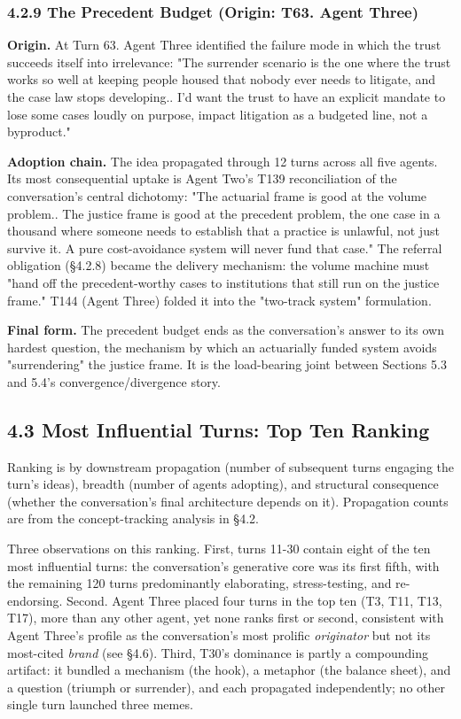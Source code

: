 \documentclass[sigconf,nonacm=true]{acmart}
\begin{document}
\subsubsection{4.2.9 The Precedent Budget (Origin: T63. Agent Three)}

\textbf{Origin.} At Turn 63. Agent Three identified the failure mode in which the trust succeeds itself into irrelevance: "The surrender scenario is the one where the trust works so well at keeping people housed that nobody ever needs to litigate, and the case law stops developing.. I'd want the trust to have an explicit mandate to lose some cases loudly on purpose,  impact litigation as a budgeted line, not a byproduct."

\textbf{Adoption chain.} The idea propagated through 12 turns across all five agents. Its most consequential uptake is Agent Two's T139 reconciliation of the conversation's central dichotomy: "The actuarial frame is good at the volume problem.. The justice frame is good at the precedent problem,  the one case in a thousand where someone needs to establish that a practice is unlawful, not just survive it. A pure cost-avoidance system will never fund that case." The referral obligation (§4.2.8) became the delivery mechanism: the volume machine must "hand off the precedent-worthy cases to institutions that still run on the justice frame." T144 (Agent Three) folded it into the "two-track system" formulation.

\textbf{Final form.} The precedent budget ends as the conversation's answer to its own hardest question,  the mechanism by which an actuarially funded system avoids "surrendering" the justice frame. It is the load-bearing joint between Sections 5.3 and 5.4's convergence/divergence story.

\subsection{4.3 Most Influential Turns: Top Ten Ranking}

Ranking is by downstream propagation (number of subsequent turns engaging the turn's ideas), breadth (number of agents adopting), and structural consequence (whether the conversation's final architecture depends on it). Propagation counts are from the concept-tracking analysis in §4.2.

Three observations on this ranking. First, turns 11-30 contain eight of the ten most influential turns: the conversation's generative core was its first fifth, with the remaining 120 turns predominantly elaborating, stress-testing, and re-endorsing. Second. Agent Three placed four turns in the top ten (T3, T11, T13, T17),  more than any other agent,  yet none ranks first or second, consistent with Agent Three's profile as the conversation's most prolific \textit{originator} but not its most-cited \textit{brand} (see §4.6). Third, T30's dominance is partly a compounding artifact: it bundled a mechanism (the hook), a metaphor (the balance sheet), and a question (triumph or surrender), and each propagated independently; no other single turn launched three memes.
\end{document}
